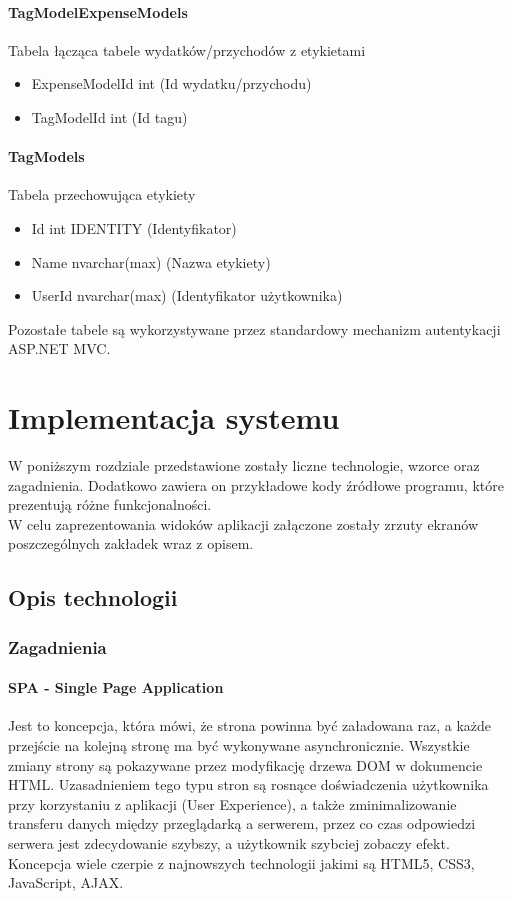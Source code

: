 \documentclass[10pt,titlepage]{article}
\begin{document}
\paragraph[short]{TagModelExpenseModels}
Tabela łącząca tabele wydatków/przychodów z etykietami
\begin{itemize}
  \item ExpenseModelId int (Id wydatku/przychodu)
  \item TagModelId int (Id tagu)
\end{itemize}
\paragraph[short]{TagModels}
Tabela przechowująca etykiety
\begin{itemize}
  \item Id int IDENTITY (Identyfikator)
  \item Name nvarchar(max) (Nazwa etykiety)
  \item UserId nvarchar(max) (Identyfikator użytkownika)
\end{itemize}
Pozostałe tabele są wykorzystywane przez standardowy mechanizm autentykacji ASP.NET MVC.
\section{Implementacja systemu}
W poniższym rozdziale przedstawione zostały liczne technologie, wzorce oraz zagadnienia. Dodatkowo zawiera on przykładowe kody źródłowe programu, które prezentują różne funkcjonalności.\\ W celu zaprezentowania widoków aplikacji załączone zostały zrzuty ekranów poszczególnych zakładek wraz z opisem.
\subsection{Opis technologii}
\subsubsection{Zagadnienia}
\paragraph{SPA - Single Page Application}
Jest to koncepcja, która mówi, że strona powinna być załadowana raz, a każde przejście na kolejną stronę ma być wykonywane asynchronicznie. Wszystkie zmiany strony są pokazywane przez modyfikację drzewa DOM w dokumencie HTML. Uzasadnieniem tego typu stron są rosnące doświadczenia użytkownika przy korzystaniu z aplikacji (User Experience), a także zminimalizowanie transferu danych między przeglądarką a serwerem, przez co czas odpowiedzi serwera jest zdecydowanie szybszy, a użytkownik szybciej zobaczy efekt. Koncepcja wiele czerpie z najnowszych technologii jakimi są HTML5, CSS3, JavaScript, AJAX.
\end{document}
